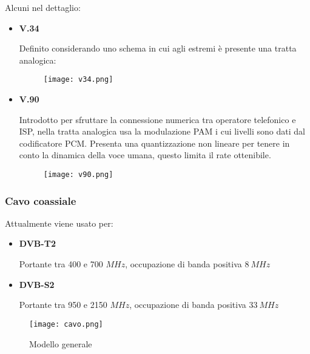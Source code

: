 \documentclass{article}
\begin{document}
\noindent Alcuni nel dettaglio:
\begin{itemize}
    \item \textbf{V.34}

        Definito considerando uno schema in cui agli estremi è presente una tratta analogica:

        \begin{figure}[ht]
            \centering
            \texttt{[image: v34.png]}
        \end{figure}

    \newpage

    \item \textbf{V.90}

        Introdotto per sfruttare la connessione numerica tra operatore telefonico e ISP, nella tratta analogica usa la modulazione PAM i cui livelli sono dati dal codificatore PCM. Presenta una quantizzazione non lineare per tenere in conto la dinamica della voce umana, questo limita il rate ottenibile.
        
        \begin{figure}[ht]
            \centering
            \texttt{[image: v90.png]}
        \end{figure}
    
\end{itemize}

\subsubsection{Cavo coassiale}

\noindent Attualmente viene usato per:
\begin{itemize}
    \item \textbf{DVB-T2}

        Portante tra 400 e 700 $MHz$, occupazione di banda positiva $8\ MHz$
    
    \item \textbf{DVB-S2}

        Portante tra 950 e 2150 $MHz$, occupazione di banda positiva $33\ MHz$\newline
    
\end{itemize}

\begin{figure}[ht]
    \centering
    \texttt{[image: cavo.png]}
    \caption{Modello generale}
\end{figure}
\end{document}
